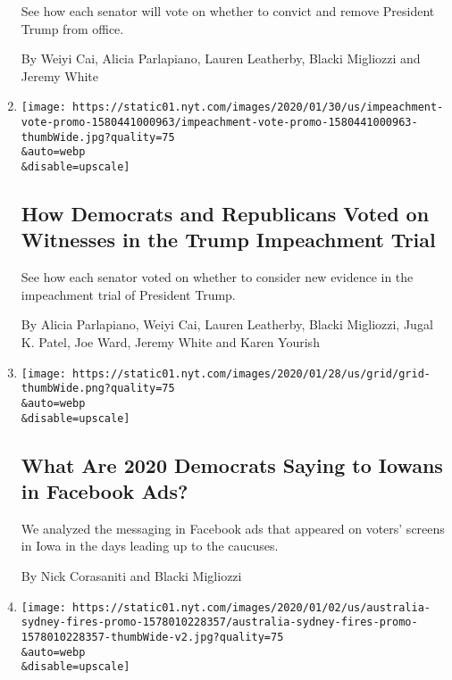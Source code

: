 \begin{enumerate}
  See how each senator will vote on whether to convict and remove
  President Trump from office.

  By Weiyi Cai, Alicia Parlapiano, Lauren Leatherby, Blacki Migliozzi
  and Jeremy White
\item
  \href{/interactive/2020/01/31/us/politics/impeachment-vote.html}{}

  \texttt{[image: https://static01.nyt.com/images/2020/01/30/us/impeachment-vote-promo-1580441000963/impeachment-vote-promo-1580441000963-thumbWide.jpg?quality=75\\\&auto=webp\\\&disable=upscale]}

  \hypertarget{how-democrats-and-republicans-voted-on-witnesses-in-the-trump-impeachment-trial}{%
  \subsection{How Democrats and Republicans Voted on Witnesses in the
  Trump Impeachment
  Trial}\label{how-democrats-and-republicans-voted-on-witnesses-in-the-trump-impeachment-trial}}

  See how each senator voted on whether to consider new evidence in the
  impeachment trial of President Trump.

  By Alicia Parlapiano, Weiyi Cai, Lauren Leatherby, Blacki Migliozzi,
  Jugal K. Patel, Joe Ward, Jeremy White and Karen Yourish
\item
  \href{/interactive/2020/01/29/us/politics/iowa-facebook-political-ads.html}{}

  \texttt{[image: https://static01.nyt.com/images/2020/01/28/us/grid/grid-thumbWide.png?quality=75\\\&auto=webp\\\&disable=upscale]}

  \hypertarget{what-are-2020-democrats-saying-to-iowans-in-facebook-ads}{%
  \subsection{What Are 2020 Democrats Saying to Iowans in Facebook
  Ads?}\label{what-are-2020-democrats-saying-to-iowans-in-facebook-ads}}

  We analyzed the messaging in Facebook ads that appeared on voters'
  screens in Iowa in the days leading up to the caucuses.

  By Nick Corasaniti and Blacki Migliozzi
\item
  \href{/interactive/2020/01/02/climate/australia-fires-map.html}{}

  \texttt{[image: https://static01.nyt.com/images/2020/01/02/us/australia-sydney-fires-promo-1578010228357/australia-sydney-fires-promo-1578010228357-thumbWide-v2.jpg?quality=75\\\&auto=webp\\\&disable=upscale]}


\end{enumerate}
